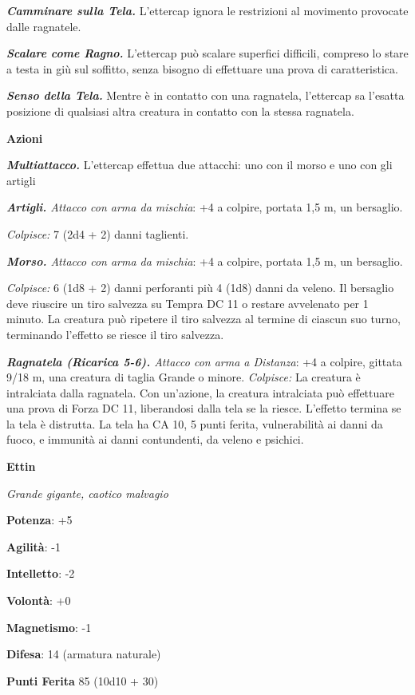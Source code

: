 \begin{multicols}{2}
\emph{\textbf{Camminare sulla Tela.}} L'ettercap ignora le restrizioni
al movimento provocate dalle ragnatele.

\emph{\textbf{Scalare come Ragno.}} L'ettercap può scalare superfici
difficili, compreso lo stare a testa in giù sul soffitto, senza bisogno
di effettuare una prova di caratteristica.

\emph{\textbf{Senso della Tela.}} Mentre è in contatto con una
ragnatela, l'ettercap sa l'esatta posizione di qualsiasi altra creatura
in contatto con la stessa ragnatela.

\textbf{Azioni}

\emph{\textbf{Multiattacco.}} L'ettercap effettua due attacchi: uno con
il morso e uno con gli artigli

\emph{\textbf{Artigli.} Attacco con arma da mischia}: +4 a colpire,
portata 1,5 m, un bersaglio.

\emph{Colpisce:} 7 (2d4 + 2) danni taglienti.

\emph{\textbf{Morso.} Attacco con arma da mischia}: +4 a colpire,
portata 1,5 m, un bersaglio.

\emph{Colpisce:} 6 (1d8 + 2) danni perforanti più 4 (1d8) danni da
veleno. Il bersaglio deve riuscire un tiro salvezza su Tempra DC
11 o restare avvelenato per 1 minuto. La creatura può ripetere il tiro
salvezza al termine di ciascun suo turno, terminando l'effetto se riesce
il tiro salvezza.

\emph{\textbf{Ragnatela (Ricarica 5-6).} Attacco con arma a Distanza}:
+4 a colpire, gittata 9/18 m, una creatura di taglia Grande o minore.
\emph{Colpisce:} La creatura è intralciata dalla ragnatela. Con
un'azione, la creatura intralciata può effettuare una prova di Forza DC
11, liberandosi dalla tela se la riesce. L'effetto termina se la tela è
distrutta. La tela ha CA 10, 5 punti ferita, vulnerabilità ai danni da
fuoco, e immunità ai danni contundenti, da veleno e psichici.

\textbf{Ettin}

\emph{Grande gigante, caotico malvagio}

\textbf{Potenza}: +5

\textbf{Agilità}: -1

\textbf{Intelletto}: -2

\textbf{Volontà}: +0

\textbf{Magnetismo}: -1

\textbf{Difesa}: 14 (armatura naturale)

\textbf{Punti Ferita} 85 (10d10 + 30)


\end{multicols}
